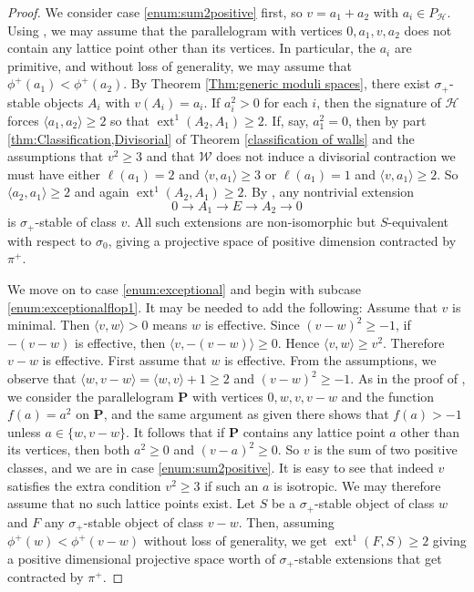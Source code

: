 \documentclass[leqno,11pt]{amsart}
\def\ext{\mathop{\mathrm{ext}}\nolimits}
\theoremstyle{definition}
\def\HH{\ensuremath{\mathcal H}}
\def\WW{\ensuremath{\mathcal W}}
\begin{document}
\begin{proof}
We consider case \ref{enum:sum2positive} first, so $v=a_1+a_2$ with $a_i\in P_{\HH}$.  Using \cite[Lemma 9.2]{BM14b}, we may assume that the parallelogram with vertices $0,a_1,v,a_2$ does not contain any lattice point other than its vertices.  In particular, the $a_i$ are primitive, and without loss of generality, we may assume that $\phi^+(a_1)<\phi^+(a_2)$.  By Theorem \ref{Thm:generic moduli spaces}, there exist $\sigma_+$-stable objects $A_i$ with $v(A_i)=a_i$.  If $a_i^2>0$ for each $i$, then the signature of $\HH$ forces $\langle a_1,a_2\rangle\geq 2$ so that $\ext^1(A_2,A_1)\geq 2$.  If, say, $a_1^2=0$, then by part \ref{thm:Classification,Divisorial} of Theorem \ref{classification of walls} and the assumptions that $v^2\geq 3$ and that $\WW$ does not induce a divisorial contraction we must have either $\ell(a_1)=2$ and $\langle v,a_1\rangle \geq 3$ or $\ell(a_1)=1$ and $\langle v,a_1\rangle\geq 2$.  So $\langle a_2,a_1\rangle\geq 2$ and again $\ext^1(A_2,A_1)\geq 2$.  By \cite[Lemma 9.3]{BM14b}, any nontrivial extension $$0\to A_1\to E\to A_2\to 0$$ is $\sigma_+$-stable of class $v$.  All such extensions are non-isomorphic but $S$-equivalent with respect to $\sigma_0$, giving a projective space of positive dimension contracted by $\pi^+$.

We move on to case \ref{enum:exceptional} and begin with subcase \ref{enum:exceptionalflop1}.  
{\color{red}
It may be needed to add the following:
Assume that $v$ is minimal. Then $\langle v,w \rangle>0$ means
$w$ is effective. Since $(v-w)^2 \geq -1$, if $-(v-w)$ is effective, then 
$\langle v,-(v-w) \rangle \ge 0$. Hence $\langle v,w \rangle \geq v^2$.
Therefore $v-w$ is effective.}
First assume that $w$ is effective.  From the assumptions, we observe that $\langle w, v-w\rangle=\langle w,v\rangle+1\geq 2$ and $(v-w)^2\geq -1$.  As in the proof of \cite[Proposition 9.1]{BM14b}, we consider the parallelogram $\mathbf{P}$ with vertices $0,w,v,v-w$ and the function $f(a)=a^2$ on $\mathbf{P}$, and the same argument as given there shows that $f(a)>-1$ unless $a\in\{w,v-w\}$.  It follows that if $\mathbf{P}$ contains any lattice point $a$ other than its vertices, then both $a^2\geq 0$ and $(v-a)^2\geq 0$.  So $v$ is the sum of two positive classes, and we are in case \ref{enum:sum2positive}.  It is easy to see that indeed $v$ satisfies the extra condition $v^2\geq 3$ if such an $a$ is isotropic.  We may therefore assume that no such lattice points exist.  Let $S$ be a $\sigma_+$-stable object of class $w$ and $F$ any $\sigma_+$-stable object of class $v-w$.  Then, assuming $\phi^+(w)<\phi^+(v-w)$ without loss of generality, we get $\ext^1(F,S)\geq2$ giving a positive dimensional projective space worth of $\sigma_+$-stable extensions that get contracted by $\pi^+$.


\end{proof}
\end{document}
